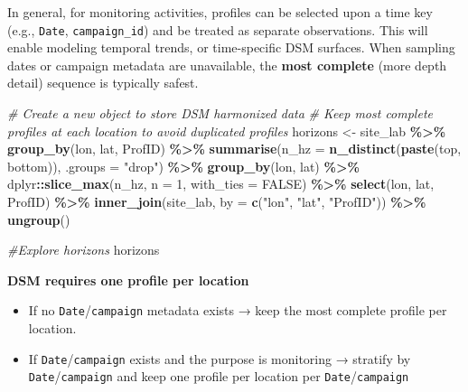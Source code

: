 \documentclass[
  10pt,
  b5paper,
  oneside]{book}
\newenvironment{Shaded}{\begin{snugshade}}{\end{snugshade}}
\newcommand{\AttributeTok}[1]{\textcolor[rgb]{0.13,0.29,0.53}{#1}}
\newcommand{\CommentTok}[1]{\textcolor[rgb]{0.56,0.35,0.01}{\textit{#1}}}
\newcommand{\ConstantTok}[1]{\textcolor[rgb]{0.56,0.35,0.01}{#1}}
\newcommand{\DecValTok}[1]{\textcolor[rgb]{0.00,0.00,0.81}{#1}}
\newcommand{\FunctionTok}[1]{\textcolor[rgb]{0.13,0.29,0.53}{\textbf{#1}}}
\newcommand{\NormalTok}[1]{#1}
\newcommand{\OtherTok}[1]{\textcolor[rgb]{0.56,0.35,0.01}{#1}}
\newcommand{\SpecialCharTok}[1]{\textcolor[rgb]{0.81,0.36,0.00}{\textbf{#1}}}
\newcommand{\StringTok}[1]{\textcolor[rgb]{0.31,0.60,0.02}{#1}}
\begin{document}
In general, for monitoring activities, profiles can be selected upon a time key (e.g., \texttt{Date}, \texttt{campaign\_id}) and be treated as separate observations. This will enable modeling temporal trends, or time-specific DSM surfaces. When sampling dates or campaign metadata are unavailable, the \textbf{most complete} (more depth detail) sequence is typically safest.

\begin{Shaded}
\begin{Highlighting}[]
\CommentTok{\# Create a new object to store DSM harmonized data}
\CommentTok{\# Keep most complete profiles at each location to avoid duplicated profiles  }
\NormalTok{horizons }\OtherTok{\textless{}{-}}\NormalTok{ site\_lab }\SpecialCharTok{\%\textgreater{}\%}
  \FunctionTok{group\_by}\NormalTok{(lon, lat, ProfID) }\SpecialCharTok{\%\textgreater{}\%}
  \FunctionTok{summarise}\NormalTok{(}\AttributeTok{n\_hz =} \FunctionTok{n\_distinct}\NormalTok{(}\FunctionTok{paste}\NormalTok{(top, bottom)), }\AttributeTok{.groups =} \StringTok{"drop"}\NormalTok{) }\SpecialCharTok{\%\textgreater{}\%}
  \FunctionTok{group\_by}\NormalTok{(lon, lat) }\SpecialCharTok{\%\textgreater{}\%}
\NormalTok{  dplyr}\SpecialCharTok{::}\FunctionTok{slice\_max}\NormalTok{(n\_hz, }\AttributeTok{n =} \DecValTok{1}\NormalTok{, }\AttributeTok{with\_ties =} \ConstantTok{FALSE}\NormalTok{) }\SpecialCharTok{\%\textgreater{}\%}
  \FunctionTok{select}\NormalTok{(lon, lat, ProfID) }\SpecialCharTok{\%\textgreater{}\%}
  \FunctionTok{inner\_join}\NormalTok{(site\_lab, }\AttributeTok{by =} \FunctionTok{c}\NormalTok{(}\StringTok{"lon"}\NormalTok{, }\StringTok{"lat"}\NormalTok{, }\StringTok{"ProfID"}\NormalTok{)) }\SpecialCharTok{\%\textgreater{}\%}
  \FunctionTok{ungroup}\NormalTok{()}

\CommentTok{\#Explore horizons}
\NormalTok{horizons}
\end{Highlighting}
\end{Shaded}

\textbf{DSM requires one profile per location}

\begin{itemize}
\item
  If no \texttt{Date}/\texttt{campaign} metadata exists → keep the most complete profile per location.
\item
  If \texttt{Date}/\texttt{campaign} exists and the purpose is monitoring → stratify by \texttt{Date}/\texttt{campaign} and keep one profile per location per \texttt{Date}/\texttt{campaign}
\end{itemize}
\end{document}
